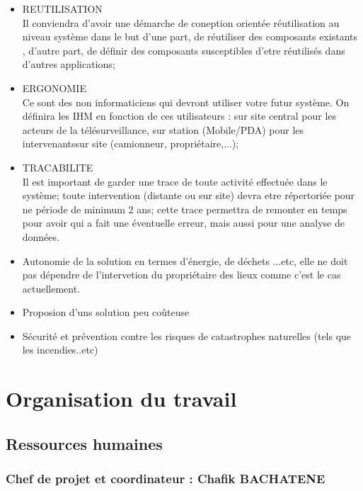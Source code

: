 \begin{itemize}
\item {REUTILISATION}\\
Il conviendra d'avoir une démarche de coneption orientée réutilisation au niveau système dans le but d'une part, de réutiliser des composants existants
, d'autre part, de définir des composants susceptibles d'etre réutilisés dans d'autres applications;
\item {ERGONOMIE}\\
Ce sont des non informaticiens qui devront utiliser votre futur système. On définira les IHM en fonction de ces utilisateurs : sur site central pour les acteurs de la télésurveillance, sur station (Mobile/PDA) pour les intervenantssur site (camionneur, propriétaire,...);
\item {TRACABILITE}\\
Il est important de garder une trace de toute activité effectuée dans le système; toute intervention (distante ou sur site) devra etre répertoriée pour ne
période de minimum 2 ans; cette trace permettra de remonter en temps pour avoir qui a fait une éventuelle erreur, mais aussi pour une analyse de données.

\item Autonomie de la solution en termes d'énergie, de déchets ...etc, elle ne doit pas dépendre de l'intervetion du propriétaire des lieux comme c'est le cas actuellement.
\item Proposion d'uns solution peu coûteuse
\item Sécurité et prévention contre les risques de catastrophes naturelles (tels que les incendies..etc)
\end{itemize}
\section{Organisation du travail}
\subsection{Ressources humaines}
\subsubsection{Chef de projet et coordinateur : Chafik \textsc{BACHATENE}}

